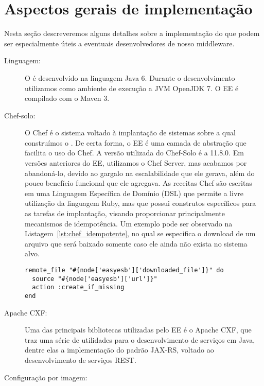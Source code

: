 \section{Aspectos gerais de implementação}

Nesta seção descreveremos alguns detalhes sobre a implementação do \ee que 
podem ser especialmente úteis a eventuais desenvolvedores de nosso middleware.

\begin{description}

\item [Linguagem:] 

O \ee é desenvolvido na linguagem Java 6. 
Durante o desenvolvimento utilizamos como ambiente de execução
a JVM OpenJDK 7. O EE é compilado com o Maven 3.

\item [Chef-solo:] 

O Chef é o sistema voltado à implantação de sistemas sobre a qual construímos o \ee.
De certa forma, o EE é uma camada de abstração que facilita o uso do Chef.
A versão utilizada do Chef-Solo é a 11.8.0.
Em versões anteriores do EE, utilizamos o Chef Server,
mas acabamos por abandoná-lo, devido ao gargalo na escalabilidade
que ele gerava, além do pouco benefício funcional que ele agregava.
As receitas Chef são escritas em uma Linguagem Específica de Domínio (DSL) 
que permite a livre
utilização da linguagem Ruby, mas que possui construtos
específicos para as tarefas de implantação, visando proporcionar
principalmente mecanismos de idempotência. Um exemplo pode ser
observado na Listagem~\ref{lst:chef_idempotente}, no qual
se especifica o download de um arquivo que será
baixado somente caso ele ainda não exista no sistema alvo.

\begin{lstlisting}[frame=trbl, label=lst:chef_idempotente, caption=Trecho de receita Chef que ilustra uso de idempotência.]
remote_file "#{node['easyesb']['downloaded_file']}" do
  source "#{node['easyesb']['url']}"
  action :create_if_missing
end
\end{lstlisting}

\item [Apache CXF:]

Uma das principais bibliotecas utilizadas pelo EE é o Apache CXF,
que traz uma série de utilidades para o desenvolvimento de serviços em Java,
dentre elas a implementação do padrão JAX-RS, voltado ao desenvolvimento de serviços REST.

\item [Configuração por imagem:]


\end{description}

